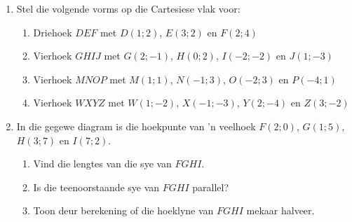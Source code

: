 \begin{eocexercises}{}
\begin{enumerate}[noitemsep, label=\textbf{\arabic*}. ] 
\item 
Stel die volgende vorms op die Cartesiese vlak voor: 
\begin{enumerate}[noitemsep, label=\textbf{(\alph*)} ]
\item Driehoek $DEF$ met $D(1;2)$, $E(3;2)$ en $F(2;4)$ 
\item Vierhoek $GHIJ$ met $G(2;-1)$, $H(0;2)$, $I(-2;-2)$ en $J(1;-3)$
\item Vierhoek $MNOP$ met $M(1;1)$, $N(-1;3)$, $O(-2;3)$ en $P(-4;1)$ 
\item Vierhoek $WXYZ$ met $W(1;-2)$, $X(-1;-3)$, $Y(2;-4)$ en $Z(3;-2)$
\end{enumerate}
\item 
In die gegewe diagram is die hoekpunte van ’n veelhoek $F(2;0)$, $G(1;5)$, $H(3;7)$ en $I(7;2)$.
    \setcounter{subfigure}{0}
    \begin{figure}[H] %
      \begin{center}
      \end{center}
    \end{figure}  
\begin{enumerate}[noitemsep, label=\textbf{(\alph*)} ]
\item Vind die lengtes van die sye van $FGHI$.
\item Is die teenoorstaande sye van $FGHI$ parallel?
\item Toon deur berekening of die hoeklyne van $FGHI$ mekaar halveer.

\end{enumerate}
\end{enumerate}
\end{eocexercises}
